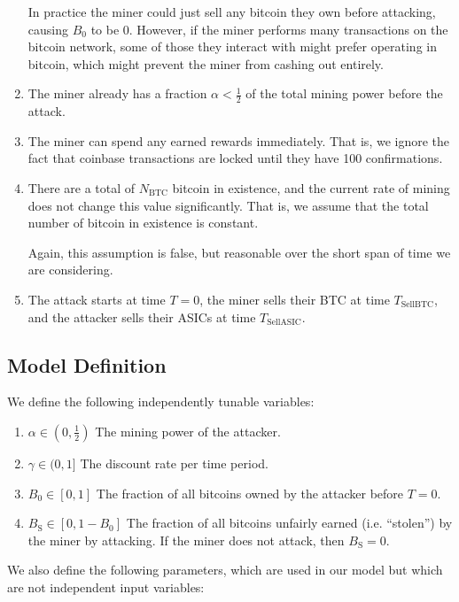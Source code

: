 \documentclass[12pt]{article}
\newcommand*{\Time}{T}
\newcommand*{\ABtcOrig}{{B_0}}
\newcommand*{\ABtcStolen}{{B_{\mathrm{S}}}}
\newcommand*{\NumBtc}{{N_{\mathrm{BTC}}}}
\newcommand*{\TimeCashOut}{{T_{\mathrm{SellBTC}}}}
\newcommand*{\TimeSellAsics}{{T_{\mathrm{SellASIC}}}}
\newenvironment{defs}
  { \begin{enumerate}[labelindent=0pt,labelwidth=2.5in,itemindent=0em,align=parleft,leftmargin=!] }
  { \end{enumerate} }
\begin{document}
\begin{enumerate}
    In practice the miner could just sell any bitcoin they own before attacking, causing $\ABtcOrig$ to be $0$. However, if the miner performs many transactions on the bitcoin network, some of those they interact with might prefer operating in bitcoin, which might prevent the miner from cashing out entirely.
  \item
    The miner already has a fraction $\alpha < \frac{1}{2}$ of the total mining power
    before the attack.
  \item
    The miner can spend any earned rewards immediately. That is, we ignore
    the fact that coinbase transactions are locked until they have 100
    confirmations.
  \item
    There are a total of $\NumBtc$ bitcoin in existence, and the current rate
    of mining does not change this value significantly. That is, we assume that
    the total number of bitcoin in existence is constant.

    Again, this assumption is false, but reasonable over the short span of time we are considering.
  \item
    The attack starts at time $\Time = 0$, the miner sells their BTC at time $\TimeCashOut$, and the attacker sells their ASICs at time $\TimeSellAsics$.
\end{enumerate}

\subsection{Model Definition}

We define the following independently tunable variables:

\begin{defs}
  \item[{$\alpha \in (0, \frac{1}{2})$}]
    The mining power of the attacker.
  \item[{$\gamma \in (0, 1]$}]
    The discount rate per time period.
  \item[{$\ABtcOrig \in [0, 1]$}]
    The fraction of all bitcoins owned by the attacker before $T = 0$.
  \item[{$\ABtcStolen
      \in [0, 1 - B_0]$}]
    The fraction of all bitcoins unfairly earned (i.e. ``stolen'') by the miner by attacking. If the miner does not attack, then $\ABtcStolen = 0$.
\end{defs}

We also define the following parameters, which are used in our model but which are not independent input variables:
\end{document}
